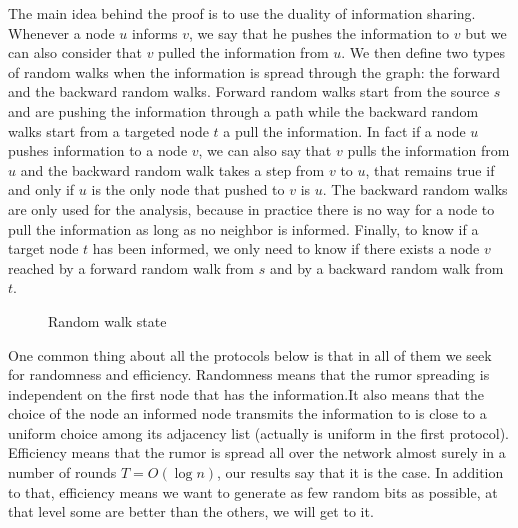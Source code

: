 \documentclass[10pt,journal,a4paper]{IEEEtran}
\begin{document}
The main idea behind the proof is to use the duality of information sharing. Whenever a node $u$ informs $v$, we say that he pushes the information to $v$ but we can also consider that $v$ pulled the information from $u$. We then define two types of random walks when the information is spread through the graph: the forward and the backward random walks. Forward random walks start from the source $s$ and are pushing the information through a path while the backward random walks start from a targeted node $t$ a pull the information. In fact if a node $u$ pushes information to a node $v$, we can also say that $v$ pulls the information from $u$ and the backward random walk takes a step from $v$ to $u$, that remains true if and only if $u$ is the only node that pushed to $v$ is $u$. The backward random walks are only used for the analysis, because in practice there is no way for a node to pull the information as long as no neighbor is informed. Finally, to know if a target node $t$ has been informed, we only need to know if there exists a node $v$ reached by a forward random walk from $s$ and by a backward random walk from $t$.


\begin{figure}[h]
\centering
{}
\caption{Random walk state}
\label{fig:lazyFSM}
\end{figure}
 One common thing about all  the protocols below is that in all of them we seek for randomness and efficiency. Randomness means that the rumor spreading is independent on the first node that has the information.It also means that the choice of the node an informed node transmits the  information to is close to a uniform choice among its adjacency list (actually is uniform in the first protocol). Efficiency means that the rumor is spread all over the network almost surely in a number of rounds $T=O(\log n)$, our results say that it is the case. In addition to that, efficiency means we want to generate as few random bits as possible, at that level some are better than the others, we will get to it.
\end{document}
